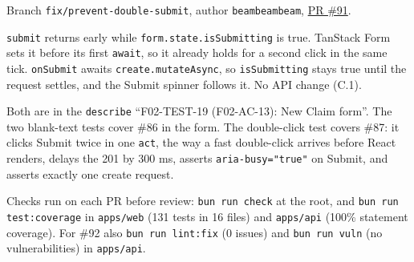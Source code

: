 
Branch \texttt{fix/prevent-double-submit}, author \texttt{beambeambeam}, \href{https://github.com/beambeambeam/claimflow/pull/91}{PR \#91}.

\texttt{submit} returns early while \texttt{form.state.isSubmitting} is true. TanStack Form sets it before its first \texttt{await}, so it already holds for a second click in the same tick.
\texttt{onSubmit} awaits \texttt{create.mutateAsync}, so \texttt{isSubmitting} stays true until the request settles, and the Submit spinner follows it. No API change (C.1).



Both are in the \texttt{describe} ``F02-TEST-19 (F02-AC-13): New Claim form''.
The two blank-text tests cover \#86 in the form. The double-click test covers \#87: it clicks Submit twice in one \texttt{act}, the way a fast double-click arrives before React renders, delays the 201 by 300 ms, asserts \texttt{aria-busy="true"} on Submit, and asserts exactly one create request.




Checks run on each PR before review: \texttt{bun run check} at the root, and \texttt{bun run test:coverage} in \texttt{apps/web} (131 tests in 16 files) and \texttt{apps/api} (100\% statement coverage). For \#92 also \texttt{bun run lint:fix} (0 issues) and \texttt{bun run vuln} (no vulnerabilities) in \texttt{apps/api}.

